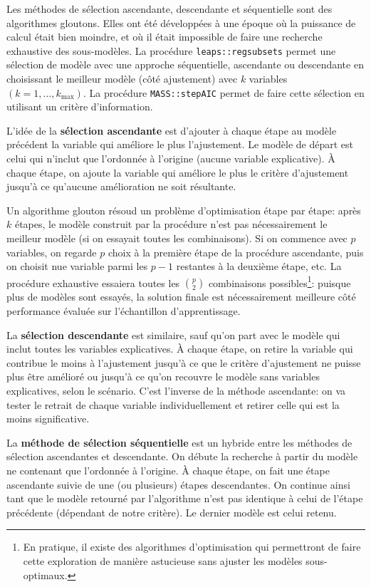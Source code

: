\documentclass[
  11pt,
  letterpaper,
]{book}
\theoremstyle{definition}
\theoremstyle{remark}
\begin{document}
Les méthodes de sélection ascendante, descendante et séquentielle sont
des algorithmes gloutons. Elles ont été développées à une époque où la
puissance de calcul était bien moindre, et où il était impossible de
faire une recherche exhaustive des sous-modèles. La procédure
\texttt{leaps::regsubsets} permet une sélection de modèle avec une
approche séquentielle, ascendante ou descendante en choisissant le
meilleur modèle (côté ajustement) avec \(k\) variables
\((k=1, \ldots, k_{\text{max}})\). La procédure \texttt{MASS::stepAIC}
permet de faire cette sélection en utilisant un critère d'information.

L'idée de la \textbf{sélection ascendante} est d'ajouter à chaque étape
au modèle précédent la variable qui améliore le plus l'ajustement. Le
modèle de départ est celui qui n'inclut que l'ordonnée à l'origine
(aucune variable explicative). À chaque étape, on ajoute la variable qui
améliore le plus le critère d'ajustement jusqu'à ce qu'aucune
amélioration ne soit résultante.

Un algorithme glouton résoud un problème d'optimisation étape par étape:
après \(k\) étapes, le modèle construit par la procédure n'est pas
nécessairement le meilleur modèle (si on essayait toutes les
combinaisons). Si on commence avec \(p\) variables, on regarde \(p\)
choix à la première étape de la procédure ascendante, puis on choisit
nue variable parmi les \(p-1\) restantes à la deuxième étape, etc. La
procédure exhaustive essaiera toutes les \(\binom{p}{2}\) combinaisons
possibles\footnote{En pratique, il existe des algorithmes d'optimisation
  qui permettront de faire cette exploration de manière astucieuse sans
  ajuster les modèles sous-optimaux.}: puisque plus de modèles sont
essayés, la solution finale est nécessairement meilleure côté
performance évaluée sur l'échantillon d'apprentissage.

La \textbf{sélection descendante} est similaire, sauf qu'on part avec le
modèle qui inclut toutes les variables explicatives. À chaque étape, on
retire la variable qui contribue le moins à l'ajustement jusqu'à ce que
le critère d'ajustement ne puisse plus être amélioré ou jusqu'à ce qu'on
recouvre le modèle sans variables explicatives, selon le scénario. C'est
l'inverse de la méthode ascendante: on va tester le retrait de chaque
variable individuellement et retirer celle qui est la moins
significative.

La \textbf{méthode de sélection séquentielle} est un hybride entre les
méthodes de sélection ascendantes et descendante. On débute la recherche
à partir du modèle ne contenant que l'ordonnée à l'origine. À chaque
étape, on fait une étape ascendante suivie de une (ou plusieurs) étapes
descendantes. On continue ainsi tant que le modèle retourné par
l'algorithme n'est pas identique à celui de l'étape précédente
(dépendant de notre critère). Le dernier modèle est celui retenu.
\end{document}
